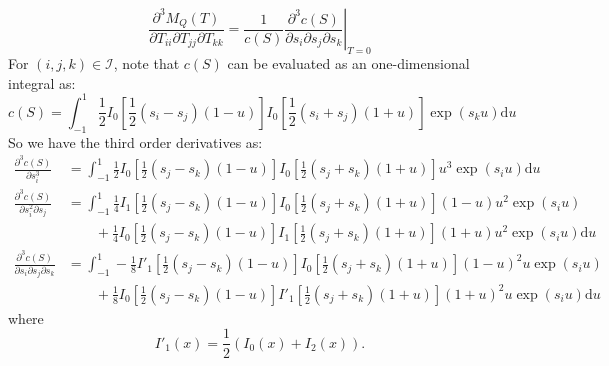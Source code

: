 \documentclass[10pt]{article}
\newcommand{\diff}[1]{\ensuremath{\mathrm{d} #1}}
\begin{document}
\begin{equation}
	\frac{\partial^3 M_Q(T)}{\partial T_{ii} \partial T_{jj} \partial T_{kk}} = \frac{1}{c(S)} \left. \frac{\partial^3 c(S)}{\partial s_i \partial s_j \partial s_k} \right|_{T=0}
\end{equation}
For $(i,j,k)\in\mathcal{I}$, note that $c(S)$ can be evaluated as an one-dimensional integral as:
\begin{equation}
	c(S) = \int_{-1}^{1} \frac{1}{2} I_0\left[ \frac{1}{2}(s_i-s_j)(1-u) \right] I_0\left[ \frac{1}{2}(s_i+s_j)(1+u) \right] \exp(s_ku)\diff{u}
\end{equation}
So we have the third order derivatives as:
\begin{align} \label{eqn:thirdDeriv}
	\frac{\partial^3 c(S)}{\partial s_i^3} &= \int_{-1}^1 \frac{1}{2} I_0\left[ \frac{1}{2}(s_j-s_k)(1-u) \right] I_0\left[ \frac{1}{2}(s_j+s_k)(1+u) \right] u^3\exp(s_iu)\diff{u} \nonumber \\
	\frac{\partial^3 c(S)}{\partial s_i^2 \partial s_j} &= \int_{-1}^1 \frac{1}{4} I_1\left[ \frac{1}{2}(s_j-s_k)(1-u) \right] I_0\left[ \frac{1}{2}(s_j+s_k)(1+u) \right] (1-u)u^2\exp(s_iu) \nonumber \\
	&\qquad + \frac{1}{4} I_0\left[ \frac{1}{2}(s_j-s_k)(1-u) \right] I_1\left[ \frac{1}{2}(s_j+s_k)(1+u) \right] (1+u)u^2\exp(s_iu)\diff{u} \nonumber \\
	\frac{\partial^3 c(S)}{\partial s_i \partial s_j \partial s_k} &= \int_{-1}^1 -\frac{1}{8} I'_1\left[ \frac{1}{2}(s_j-s_k)(1-u) \right] I_0\left[ \frac{1}{2}(s_j+s_k)(1+u) \right] (1-u)^2u\exp(s_iu) \nonumber \\
	&\qquad + \frac{1}{8}I_0\left[ \frac{1}{2}(s_j-s_k)(1-u) \right] I'_1\left[ \frac{1}{2}(s_j+s_k)(1+u) \right] (1+u)^2u\exp(s_iu)\diff{u}
\end{align}
where
\begin{equation}
	I'_1(x) = \frac{1}{2}(I_0(x)+I_2(x)).
\end{equation}
\end{document}
